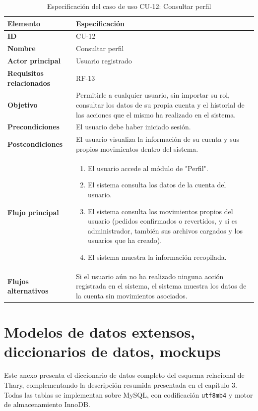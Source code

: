 \begin{table}[H]
\centering
\caption{Especificación del caso de uso CU-12: Consultar perfil}
\label{tab:cu12_consultar_perfil}
\renewcommand{\arraystretch}{1.3}
\begin{tabularx}{\textwidth}{|>{\bfseries}p{3.5cm}|X|}
\hline
Elemento & Especificación \\
\hline
ID & CU-12 \\
\hline
Nombre & Consultar perfil \\
\hline
Actor principal & Usuario registrado \\
\hline
Requisitos relacionados & RF-13 \\
\hline
Objetivo & Permitirle a cualquier usuario, sin importar su rol, consultar los datos de su propia cuenta y el historial de las acciones que el mismo ha realizado en el sistema. \\
\hline
Precondiciones & El usuario debe haber iniciado sesión. \\
\hline
Postcondiciones & El usuario visualiza la información de su cuenta y sus propios movimientos dentro del sistema. \\
\hline
Flujo principal &
\begin{enumerate}
    \item El usuario accede al módulo de "Perfil".
    \item El sistema consulta los datos de la cuenta del usuario.
    \item El sistema consulta los movimientos propios del usuario (pedidos confirmados o revertidos, y si es administrador, también sus archivos cargados y los usuarios que ha creado).
    \item El sistema muestra la información recopilada.
\end{enumerate} \\
\hline
Flujos alternativos & Si el usuario aún no ha realizado ninguna acción registrada en el sistema, el sistema muestra los datos de la cuenta sin movimientos asociados. \\
\hline
\end{tabularx}
\end{table}

\section{Modelos de datos extensos, diccionarios de datos, mockups}

Este anexo presenta el diccionario de datos completo del esquema relacional de Thary, complementando la descripción resumida presentada en el capítulo 3. Todas las tablas se implementan sobre MySQL, con codificación \texttt{utf8mb4} y motor de almacenamiento InnoDB.

